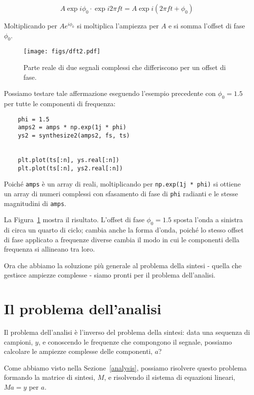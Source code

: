 \documentclass[12pt]{book} \usepackage[width=5.5in,height=8.5in, hmarginratio=3:2,vmarginratio=1:1]{geometry}
\begin{document}
%
\[ A \exp{i \phi_0} \cdot \exp{i 2 \pi f t} = A \exp{i (2 \pi f t + \phi_0)} \] 

%
Moltiplicando per $A e^{i \phi_0}$ si moltiplica l'ampiezza per $A$ e si somma l'offset di fase $\phi_0$.

\begin{figure} 

\centerline{\texttt{[image: figs/dft2.pdf]}} \caption{Parte reale di due segnali complessi che differiscono per un offset di fase.} \label{fig.dft2} \end{figure} 

Possiamo testare tale affermazione eseguendo l'esempio precedente con $\phi_0 = 1.5$ per tutte le componenti di frequenza:

\begin{verbatim} 
    phi = 1.5
    amps2 = amps * np.exp(1j * phi)
    ys2 = synthesize2(amps2, fs, ts)


    plt.plot(ts[:n], ys.real[:n])
    plt.plot(ts[:n], ys2.real[:n])
 \end{verbatim} 

Poiché {\tt amps} è un array di reali, moltiplicando per {\tt np.exp(1j * phi)} si ottiene un array di numeri complessi con sfasamento di fase di {\tt phi} radianti e le stesse magnitudini di {\tt amps}.

La Figura~\ref{fig.dft2} mostra il risultato. L'offset di fase $\phi_0 = 1.5$ sposta l'onda a sinistra di circa un quarto di ciclo; cambia anche la forma d'onda, poiché lo stesso offset di fase applicato a frequenze diverse cambia il modo in cui le componenti della frequenza si allineano tra loro.

Ora che abbiamo la soluzione più generale al problema della sintesi - quella che gestisce ampiezze complesse - siamo pronti per il problema dell'analisi.

\section{Il problema dell'analisi} 

Il problema dell'analisi è l'inverso del problema della sintesi: data una sequenza di campioni, $y$, e conoscendo le frequenze che compongono il segnale, possiamo calcolare le ampiezze complesse delle componenti, $a$?

Come abbiamo visto nella Sezione~\ref{analysis}, possiamo risolvere questo problema formando la matrice di sintesi, $M$, e risolvendo il sistema di equazioni lineari, $M a = y$ per $a$.
\end{document}
